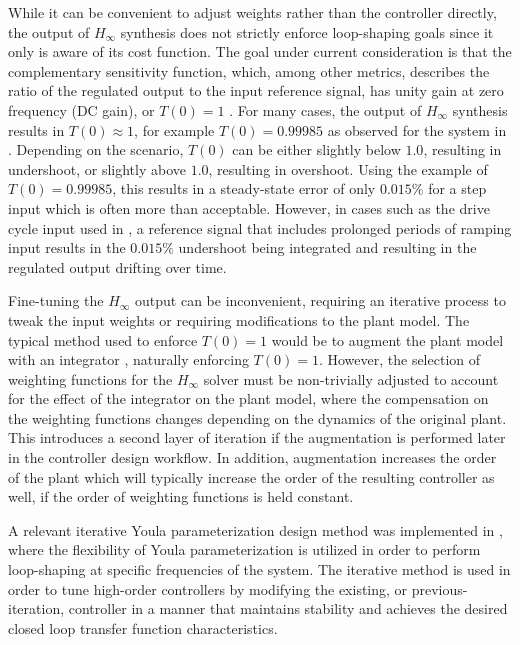 \documentclass[journal,article,submit,pdftex,moreauthors]{Definitions/mdpi}
\begin{document}
While it can be convenient to adjust weights rather than the controller directly, the output of $H_\infty$ synthesis does not strictly enforce loop-shaping goals since it only is aware of its cost function. The goal under current consideration is that the complementary sensitivity function, which, among other metrics, describes the ratio of the regulated output to the input reference signal, has unity gain at zero frequency (DC gain), or $T(0) = 1$ \citep{assadian2022robust}. For many cases, the output of $H_\infty$ synthesis results in $T(0) \approx 1$, for example $T(0)=0.99985$ as observed for the system in \citep{tan2025scaling}. Depending on the scenario, $T(0)$ can be either slightly below $1.0$, resulting in undershoot, or slightly above $1.0$, resulting in overshoot. Using the example of $T(0)=0.99985$, this results in a steady-state error of only $0.015\%$ for a step input which is often more than acceptable. However, in cases such as the drive cycle input used in \citep{tan2025scaling}, a reference signal that includes prolonged periods of ramping input results in the $0.015\%$ undershoot being integrated and resulting in the regulated output drifting over time.

Fine-tuning the $H_\infty$ output can be inconvenient, requiring an iterative process to tweak the input weights or requiring modifications to the plant model. The typical method used to enforce $T(0)=1$ would be to augment the plant model with an integrator \citep{seatzu2008Hinfint}, naturally enforcing $T(0)=1$. However, the selection of weighting functions for the $H_\infty$ solver must be non-trivially adjusted to account for the effect of the integrator on the plant model, where the compensation on the weighting functions changes depending on the dynamics of the original plant. This introduces a second layer of iteration if the augmentation is performed later in the controller design workflow. In addition, augmentation increases the order of the plant which will typically increase the order of the resulting controller as well, if the order of weighting functions is held constant.

A relevant iterative Youla parameterization design method was implemented in \citep{hu2025YK}, where the flexibility of Youla parameterization is utilized in order to perform loop-shaping at specific frequencies of the system. The iterative method is used in order to tune high-order controllers by modifying the existing, or previous-iteration, controller in a manner that maintains stability and achieves the desired closed loop transfer function characteristics.
\end{document}
